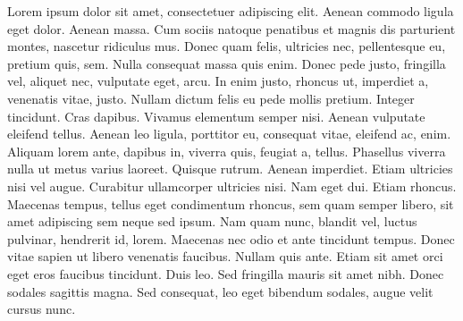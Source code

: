 Lorem ipsum dolor sit amet, consectetuer adipiscing elit. Aenean commodo ligula eget dolor. Aenean massa. Cum sociis natoque penatibus et magnis dis parturient montes, nascetur ridiculus mus. Donec quam felis, ultricies nec, pellentesque eu, pretium quis, sem. Nulla consequat massa quis enim. Donec pede justo, fringilla vel, aliquet nec, vulputate eget, arcu. In enim justo, rhoncus ut, imperdiet a, venenatis vitae, justo. Nullam dictum felis eu pede mollis pretium. Integer tincidunt. Cras dapibus. Vivamus elementum semper nisi. Aenean vulputate eleifend tellus. Aenean leo ligula, porttitor eu, consequat vitae, eleifend ac, enim. Aliquam lorem ante, dapibus in, viverra quis, feugiat a, tellus. Phasellus viverra nulla ut metus varius laoreet. Quisque rutrum. Aenean imperdiet. Etiam ultricies nisi vel augue. Curabitur ullamcorper ultricies nisi. Nam eget dui. Etiam rhoncus. Maecenas tempus, tellus eget condimentum rhoncus, sem quam semper libero, sit amet adipiscing sem neque sed ipsum. Nam quam nunc, blandit vel, luctus pulvinar, hendrerit id, lorem. Maecenas nec odio et ante tincidunt tempus. Donec vitae sapien ut libero venenatis faucibus. Nullam quis ante. Etiam sit amet orci eget eros faucibus tincidunt. Duis leo. Sed fringilla mauris sit amet nibh. Donec sodales sagittis magna. Sed consequat, leo eget bibendum sodales, augue velit cursus nunc.
